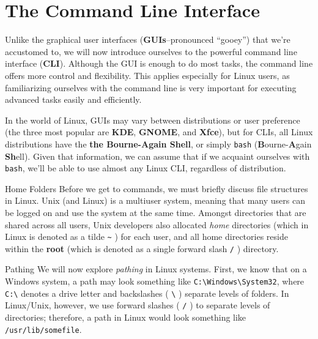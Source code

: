\documentclass[11pt,oneside]{article}
\newenvironment{articleSectionN}[1]
{#1}
{}
\begin{document}
\section{The Command Line Interface}
\begin{articleSectionN}
    Unlike the graphical user interfaces (\textbf{GUIs}--pronounced ``gooey'') that we're accustomed to, we will now introduce ourselves to the powerful command line interface (\textbf{CLI}). Although the GUI is enough to do most tasks, the command line offers more control and flexibility. This applies especially for Linux users, as familiarizing ourselves with the command line is very important for executing advanced tasks easily and efficiently.

    In the world of Linux, GUIs may vary between distributions or user preference (the three most popular are \textbf{KDE}, \textbf{GNOME}, and \textbf{Xfce}), but for CLIs, all Linux distributions have the \textbf{the Bourne-Again Shell}, or simply \lstinline{bash} (\textbf{B}ourne-\textbf{A}gain \textbf{Sh}ell). Given that information, we can assume that if we acquaint ourselves with \lstinline{bash}, we'll be able to use almost any Linux CLI, regardless of distribution.

\begin{subsection}{Home Folders}
    Before we get to commands, we must briefly discuss file structures in Linux. Unix (and Linux) is a multiuser system, meaning that many users can be logged on and use the system at the same time. Amongst directories that are shared across all users, Unix developers also allocated \emph{home} directories (which in Linux is denoted as a tilde \lstinline{~} ) for each user, and all home directories reside within the \textbf{root} (which is denoted as a single forward slash \texttt{/} ) directory.


\end{subsection}

\begin{subsection}{Pathing}
We will now explore \emph{pathing} in Linux systems. First, we know that on a Windows system, a path may look something like \lstinline{C:\Windows\System32}, where \lstinline{C:\} denotes a drive letter and backslashes ( \lstinline{\} ) separate levels of folders.
In Linux/Unix, however, we use forward slashes ( \lstinline{/} ) to separate levels of directories; therefore, a path in Linux would look something like \lstinline{/usr/lib/somefile}.


\end{subsection}
\end{articleSectionN}
\end{document}

